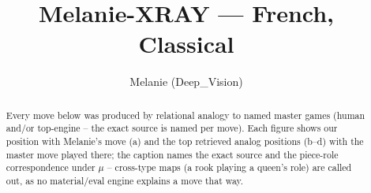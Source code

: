 \documentclass[11pt]{article}
\title{Melanie-XRAY — French, Classical}
\author{Melanie (Deep\_Vision)}
\date{}
\begin{document}
\maketitle

\begin{abstract}Every move below was produced by relational analogy to named master games (human and/or top-engine -- the exact source is named per move). Each figure shows our position with Melanie's move (a) and the top retrieved analog positions (b--d) with the master move played there; the caption names the exact source and the piece-role correspondence under $\mu$ -- cross-type maps (a rook playing a queen's role) are called out, as no material/eval engine explains a move that way.\end{abstract}

\begin{figure}[p]\centering
\begin{subfigure}{0.46\textwidth}\centering
\resizebox{\linewidth}{!}{%
\newchessgame
\chessboard[
  setfen={rnb1k2r/pppnqppp/4p3/3pP3/3P1P2/2N5/PPP3PP/R2QKBNR b KQkq - 0 7},
  showmover=false,
  pgfstyle=straightmove, color=movearrow, markmove={a7-a6}
]}
\caption{}
\end{subfigure}\hfill
\begin{subfigure}{0.46\textwidth}\centering
\resizebox{\linewidth}{!}{%
\newchessgame
\chessboard[
  setfen={rnb1k2r/pppnqppp/4p3/3pP3/3P1P2/2N5/PPP3PP/R2QKBNR b KQkq - 0 7},
  showmover=false,
  pgfstyle=straightmove, color=movearrow, markmove={a7-a6}
]}
\caption{}
\end{subfigure}
\\[4pt]
\begin{subfigure}{0.46\textwidth}\centering
\resizebox{\linewidth}{!}{%
\newchessgame
\chessboard[
  setfen={rnb1k2r/pppnqppp/4p3/3pP3/3P1P2/2N5/PPP3PP/R2QKBNR b KQkq - 0 7},
  showmover=false,
  pgfstyle=straightmove, color=movearrow, markmove={a7-a6}
]}
\caption{}
\end{subfigure}\hfill
\begin{subfigure}{0.46\textwidth}\centering
\resizebox{\linewidth}{!}{%
\newchessgame
\chessboard[
  setfen={rnb1k2r/pppnqppp/4p3/3pP3/3P1P2/2N5/PPP3PP/R2QKBNR b KQkq - 0 7},
  showmover=false,
  pgfstyle=straightmove, color=movearrow, markmove={a7-a6}
]}
\caption{}
\end{subfigure}

\end{figure}
\end{document}
